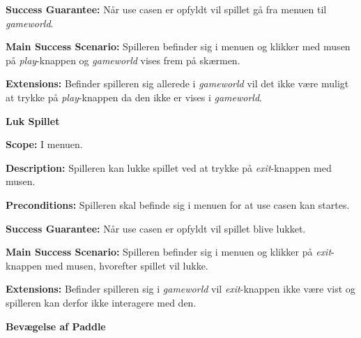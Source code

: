 \textbf{Success Guarantee:}\newline
Når use casen er opfyldt vil spillet gå fra menuen til \textit{gameworld}.\newline

\textbf{Main Success Scenario:}\newline
Spilleren befinder sig i menuen og klikker med musen på \textit{play}-knappen og \textit{gameworld} vises frem på skærmen.\newline

\textbf{Extensions:}\newline
Befinder spilleren sig allerede i \textit{gameworld} vil det ikke være muligt at trykke på \textit{play}-knappen da den ikke er vises i \textit{gameworld}.\newline \newline



\textbf{Luk Spillet}\newline

\textbf{Scope:}\newline
I menuen. \newline

\textbf{Description:} \newline
Spilleren kan lukke spillet ved at trykke på \textit{exit}-knappen med musen.\newline

\textbf{Preconditions:}\newline
Spilleren skal befinde sig i menuen for at use casen kan startes.\newline

\textbf{Success Guarantee:}\newline
Når use casen er opfyldt vil spillet blive lukket. \newline

\textbf{Main Success Scenario:}\newline
Spilleren befinder sig i menuen og klikker på \textit{exit}-knappen med musen, hvorefter spillet vil lukke.\newline

\textbf{Extensions:}\newline
Befinder spilleren sig i \textit{gameworld} vil \textit{exit}-knappen ikke være vist og spilleren kan derfor ikke interagere med den. \newline \newline


\textbf{Bevægelse af Paddle}\newline

